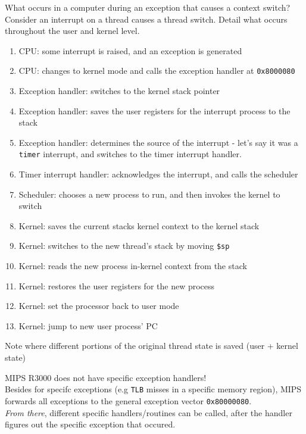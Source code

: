 \documentclass[journal, letterpaper]{IEEEtran}
\begin{document}
\begin{example}{What occurs in a computer during an exception that causes a context switch?} \\
    Consider an interrupt on a thread causes a thread switch. Detail what occurs throughout
    the user and kernel level.
    \begin{enumerate}
        \item CPU: some interrupt is raised, and an exception is generated
        \item CPU: changes to kernel mode and calls the exception handler at \verb|0x8000080|
        \item Exception handler: switches to the kernel stack pointer
        \item Exception handler: saves the user registers for the interrupt process to the stack
        \item Exception handler: determines the source of the interrupt - let's say it was a \verb|timer| interrupt, and switches to the timer interrupt handler.
        \item Timer interrupt handler: acknowledges the interrupt, and calls the scheduler
        \item Scheduler: chooses a new process to run, and then invokes the kernel to switch
        \item Kernel: saves the current stacks kernel context to the kernel stack
        \item Kernel: switches to the new thread's stack by moving \verb|$sp|
        \item Kernel: reads the new process in-kernel context from the stack
        \item Kernel: restores the user registers for the new process
        \item Kernel: set the processor back to user mode
        \item Kernel: jump to new user process' PC
    \end{enumerate}
    Note where different portions of the original thread state is saved (user + kernel state)
\end{example}
\begin{aside}{MIPS R3000 does not have specific exception handlers!} \\ 
    Besides for specifc exceptions (e.g \verb|TLB| misses in a specific memory region), MIPS forwards all exceptions to the general exception vector \verb|0x80000080|.
    \newline \\
    \textit{From there}, different specific handlers/routines can be called, after the handler figures out the specific exception that occured.
\end{aside}
\end{document}
